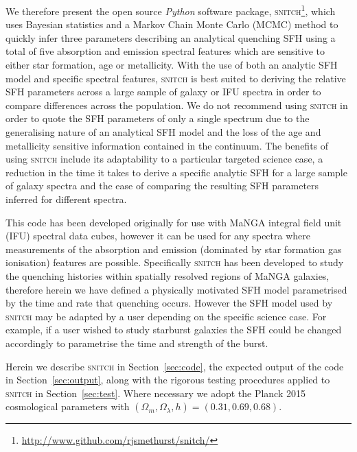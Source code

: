 \documentclass[useAMS,usenatbib]{mn2e}
\def\referee		{\color{refer}}
\begin{document}
We therefore present the open source \emph{Python} software package, \textsc{snitch}\footnote{\url{http://www.github.com/rjsmethurst/snitch/}}, which uses Bayesian statistics and a Markov Chain Monte Carlo (MCMC) method to quickly infer three parameters describing an analytical quenching SFH using a total of five absorption and emission spectral features which are sensitive to either star formation, age or metallicity. {\referee With the use of both an analytic SFH model and specific spectral features}, \textsc{snitch} is best suited to deriving the relative SFH parameters across a large sample of galaxy or IFU spectra in order to compare differences across the population. We do not recommend using \textsc{snitch} in order to quote the SFH parameters of only a single spectrum due to the generalising nature of an analytical SFH model {\referee and the loss of the age and metallicity sensitive information contained in the continuum.}  The benefits of using \textsc{snitch} include its adaptability to a particular targeted science case, a reduction in the time it takes to derive a specific analytic SFH for a large sample of galaxy spectra and the ease of comparing the resulting SFH parameters inferred for different spectra. 

This code has been developed originally for use with MaNGA integral field unit (IFU) spectral data cubes, however it can be used for any spectra where measurements of the absorption and emission (dominated by star formation gas ionisation) features are possible. Specifically \textsc{snitch} has been developed to study the quenching histories within spatially resolved regions of MaNGA galaxies, therefore herein we have defined a physically motivated SFH model parametrised by the time and rate that quenching occurs. However the SFH model used by \textsc{snitch} may be adapted by a user depending on the specific science case. For example, if a user wished to study starburst galaxies the SFH could be changed accordingly to parametrise the time and strength of the burst. 


Herein we describe \textsc{snitch} in Section~\ref{sec:code}, the expected output of the code in Section~\ref{sec:output}, along with the rigorous testing procedures applied to \textsc{snitch} in Section~\ref{sec:test}. Where necessary we adopt the Planck 2015 \citep{planck16} cosmological parameters with $(\Omega_m, \Omega_{\lambda}, h) = (0.31, 0.69, 0.68)$. 
\end{document}
